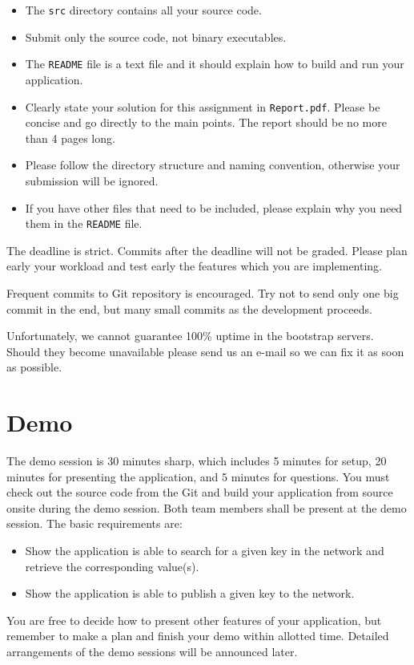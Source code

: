 \documentclass[12pt, a4paper]{article}
\begin{document}
\begin{itemize}
\item The \texttt{src} directory contains all your source code.
\item Submit only the source code, not binary executables.
\item The \texttt{README} file is a text file and it should explain how to build and run your application.
\item Clearly state your solution for this assignment in \texttt{Report.pdf}. Please be concise and go directly to the main points. The report should be no more than 4 pages long.
\item Please follow the directory structure and naming convention, otherwise your submission will be ignored.
\item If you have other files that need to be included, please explain why you need them in the \texttt{README} file.
\end{itemize}

The deadline is strict.
Commits after the deadline will not be graded.
Please plan early your workload and test early the features which you are implementing.

Frequent commits to Git repository is encouraged.
Try not to send only one big commit in the end, but many small commits as the development proceeds.

Unfortunately, we cannot guarantee 100\% uptime in the bootstrap servers.
Should they become unavailable please send us an e-mail so we can fix it as soon as possible.


\section{Demo}
The demo session is 30 minutes sharp, which includes 5 minutes for setup, 20 minutes for presenting the application, and 5 minutes for questions.
You must check out the source code from the Git and build your application from source onsite during the demo session.
Both team members shall be present at the demo session.
The basic requirements are:
\begin{itemize}
\item Show the application is able to search for a given key in the network and retrieve the corresponding value(s).
\item Show the application is able to publish a given key to the network.
\end{itemize}
You are free to decide how to present other features of your application, but remember to make a plan and finish your demo within allotted time.
Detailed arrangements of the demo sessions will be announced later.
\end{document}

